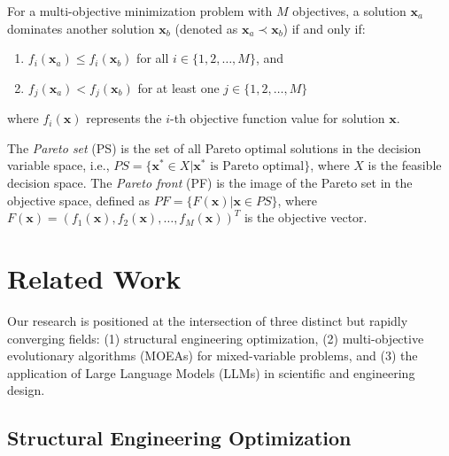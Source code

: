\documentclass[preprint,12pt]{elsarticle}
\begin{document}
\begin{definition}[Dominance]
    For a multi-objective minimization problem with $M$ objectives, a solution $\mathbf{x}_a$ dominates another solution $\mathbf{x}_b$ (denoted as $\mathbf{x}_a \prec \mathbf{x}_b$) if and only if:
    \begin{enumerate}
        \item $f_i(\mathbf{x}_a) \leq f_i(\mathbf{x}_b)$ for all $i \in \{1, 2, \ldots, M\}$, and
        \item $f_j(\mathbf{x}_a) < f_j(\mathbf{x}_b)$ for at least one $j \in \{1, 2, \ldots, M\}$
    \end{enumerate}
    where $f_i(\mathbf{x})$ represents the $i$-th objective function value for solution $\mathbf{x}$.
\end{definition}

\begin{definition}
    The \textit{Pareto set} (PS) is the set of all Pareto optimal solutions in the decision variable space, i.e., $PS = \{\mathbf{x}^* \in X | \mathbf{x}^* \text{ is Pareto optimal}\}$, where $X$ is the feasible decision space. The \textit{Pareto front} (PF) is the image of the Pareto set in the objective space, defined as $PF = \{F(\mathbf{x}) | \mathbf{x} \in PS\}$, where $F(\mathbf{x}) = (f_1(\mathbf{x}), f_2(\mathbf{x}), \ldots, f_M(\mathbf{x}))^T$ is the objective vector.
\end{definition}

\section{Related Work}

Our research is positioned at the intersection of three distinct but rapidly converging fields: (1) structural engineering optimization, (2) multi-objective evolutionary algorithms (MOEAs) for mixed-variable problems, and (3) the application of Large Language Models (LLMs) in scientific and engineering design.

\subsection{Structural Engineering Optimization}
\end{document}
